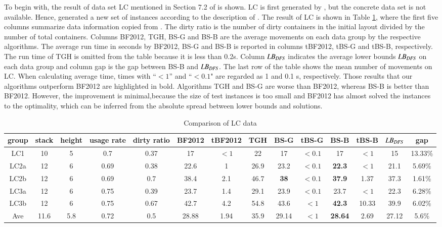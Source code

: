 \documentclass[review,3p,times,authoryear,12pt]{elsarticle}
\begin{document}
To begin with, the result of data set LC mentioned in Section 7.2 of \cite{BF2012} is shown. LC is first generated by \cite{Lee2009}, but the concrete data set is not available. Hence, \cite{BF2012} generated a new set of instances according to the description of \cite{Lee2009}. The result of LC is shown in Table \ref{tab:lc}, where the first five columns summarize data information copied from \cite{BF2012}. The dirty ratio is the number of dirty containers in the initial layout divided by the number of total containers.
Columns BF2012, TGH, BS-G and BS-B are the average movements on each data group by the respective algorithms. The average run time in seconds by BF2012, BS-G and BS-B is reported in columns tBF2012, tBS-G and tBS-B, respectively. The run time of TGH is omitted from the table because it is less than 0.2s. Column $\id{LB}_\id{DFS}$ indicates the average lower bounds $\id{LB}_\id{DFS}$ on each data group and column gap is the gap between BS-B and $\id{LB}_\id{DFS}$. The last row of the table shows the mean number of movements on LC. When calculating average time, times with ``$<1$''  and ``$<0.1$" are regarded as 1 and 0.1 s, respectively. Those results that our algorithms outperform BF2012 are highlighted in bold. Algorithms TGH and BS-G are worse than BF2012, whereas BS-B is better than BF2012. However, the improvement is minimal,because the size of test instances is too small and BF2012 has almost solved the instances to the optimality, which can be inferred from the absolute spread between lower bounds and solutions.
\begin{table}[htbp]
\scriptsize
\centering
  \caption{\label{tab:lc} Comparison of LC data}
    \begin{tabular}{c|c|c|c|c|c|c|c|c|c|c|c|c|c}

    \hline
    group & stack & height & usage rate & dirty ratio & BF2012 & tBF2012 & TGH   & BS-G  & tBS-G & BS-B  & tBS-B & $\id{LB}_\id{DFS}$ & gap\\
    \hline
    LC1   & 10   & 5  & 0.7  & 0.37 & 17   & $<1$ & 22   & 17         & $<0.1$ & 17             & $<1$  & 15 & 13.33\%\\
    LC2a  & 12   & 6  & 0.69 & 0.38 & 22.6 & 1    & 26.9 & 23.2       & $<0.1$ & \textbf{22.3}  & $<1$  & 21.1 & 5.69\%\\
    LC2b  & 12   & 6  & 0.69 & 0.7  & 38.4 & 2.1  & 46.7 & \textbf{38}& $<0.1$ & \textbf{37.9}  & 1.37  & 37.3 & 1.61\%\\
    LC3a  & 12   & 6  & 0.75 & 0.39 & 23.7 & 1.4  & 29.1 & 23.9       & $<0.1$ & 23.7           & $<1$  & 22.3 & 6.28\%\\
    LC3b  & 12   & 6  & 0.75 & 0.67 & 42.7 & 4.2  & 54.8 & 43.6       & $<1$   & \textbf{42.3}  & 10.33 & 39.9 & 6.02\%\\
    \hline
    Ave   & 11.6 & 5.8& 0.72 & 0.5  & 28.88& 1.94 & 35.9 & 29.14      & $<1$   & \textbf{28.64} & 2.69  & 27.12&
    5.6\% \\
    \hline
    \end{tabular}%
\end{table}%
\end{document}

